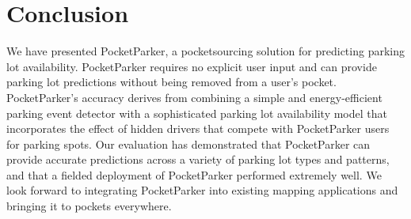 \section{Conclusion}

We have presented PocketParker, a pocketsourcing solution for predicting
parking lot availability. PocketParker requires no explicit user input and
can provide parking lot predictions without being removed from a user's
pocket. PocketParker's accuracy derives from combining a simple and
energy-efficient parking event detector with a sophisticated parking lot
availability model that incorporates the effect of hidden drivers that
compete with PocketParker users for parking spots. Our evaluation has
demonstrated that PocketParker can provide accurate predictions across a
variety of parking lot types and patterns, and that a fielded deployment of
PocketParker performed extremely well. We look forward to integrating
PocketParker into existing mapping applications and bringing it to pockets
everywhere.
